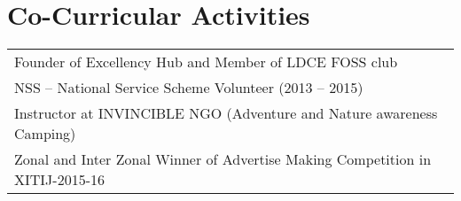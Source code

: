 \documentclass[]{deedy-resume-openfont}
\begin{document}
\begin{minipage}[t]{0.66\textwidth}

\section{Co-Curricular Activities} 

\begin{tabular}{l}
\textbullet{} Founder of Excellency Hub and Member of LDCE FOSS club \\
\textbullet{} NSS – National Service Scheme Volunteer (2013 – 2015)\\
\textbullet{} Instructor at INVINCIBLE NGO (Adventure and Nature awareness Camping)\\
\textbullet{} Zonal and Inter Zonal Winner of Advertise Making Competition in XITIJ-2015-16\\
\end{tabular}
\end{minipage} 
\end{document}
